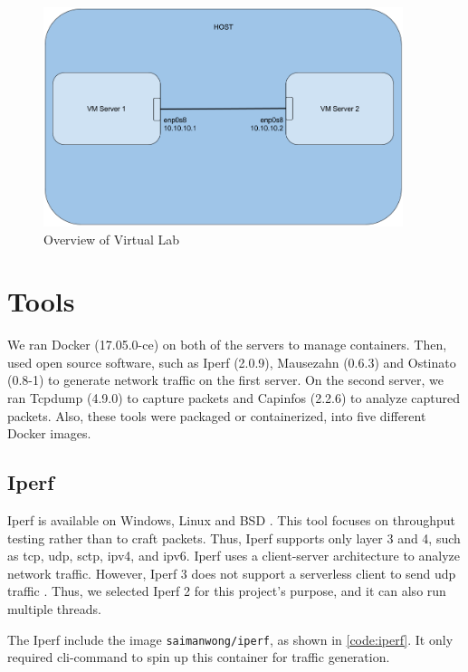 \begin{figure}[h!]
    \centering
    \includegraphics[width=10.5cm]{figure/vmenv}
    \caption{Overview of Virtual Lab}
    \label{fig:vmenv}
\end{figure}

%
%
\newline
\null\newline
\section{Tools}
We ran Docker (17.05.0-ce) on both of the servers to manage containers.
Then, used open source software, such as Iperf (2.0.9), Mausezahn (0.6.3) and Ostinato (0.8-1) to generate network traffic on the first server.
On the second server, we ran Tcpdump (4.9.0) to capture packets and Capinfos (2.2.6) to analyze captured packets.
Also, these tools were packaged or containerized, into five different Docker images.

\subsection{Iperf}
Iperf is available on Windows, Linux and BSD \cite{iperf2do7:online, iPerfThe63:online}.
This tool focuses on throughput testing rather than to craft packets.
Thus, Iperf supports only layer 3 and 4, such as \acrshort{tcp}, \acrshort{udp}, \acrshort{sctp}, \acrshort{ipv4}, and \acrshort{ipv6}.
Iperf uses a client-server architecture to analyze network traffic.
However, Iperf 3 does not support a serverless client to send \acrshort{udp} traffic \cite{Serverle80:online}.
Thus, we selected Iperf 2 for this project's purpose, and it can also run multiple threads.

\skippara The Iperf include the image \texttt{saimanwong/iperf}, as shown in \cref{code:iperf}.
It only required \gls{cli}-command to spin up this container for traffic generation.

